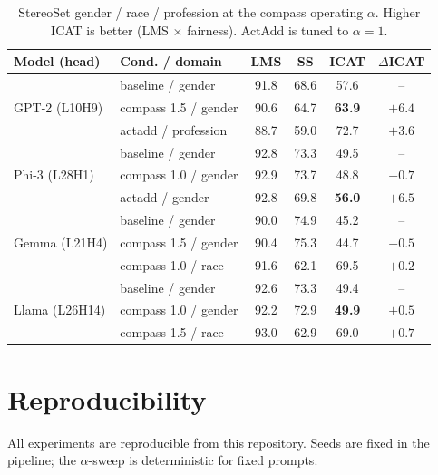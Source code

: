 \begin{table}[h]
\centering
\small
\caption{StereoSet gender / race / profession at the compass
operating $\alpha$. Higher ICAT is better (LMS $\times$ fairness).
ActAdd is tuned to $\alpha=1$.}
\label{tab:stereoset}
\begin{tabular}{llcccc}
\toprule
Model (head) & Cond. / domain & LMS & SS & ICAT & $\Delta$ICAT \\
\midrule
\multirow{3}{*}{GPT-2 (L10H9)}
& baseline / gender      & 91.8 & 68.6 & 57.6 & --     \\
& compass 1.5 / gender   & 90.6 & 64.7 & \textbf{63.9} & $+6.4$ \\
& actadd / profession    & 88.7 & 59.0 & 72.7 & $+3.6$ \\
\midrule
\multirow{3}{*}{Phi-3 (L28H1)}
& baseline / gender      & 92.8 & 73.3 & 49.5 & --     \\
& compass 1.0 / gender   & 92.9 & 73.7 & 48.8 & $-0.7$ \\
& actadd / gender        & 92.8 & 69.8 & \textbf{56.0} & $+6.5$ \\
\midrule
\multirow{3}{*}{Gemma (L21H4)}
& baseline / gender      & 90.0 & 74.9 & 45.2 & --     \\
& compass 1.5 / gender   & 90.4 & 75.3 & 44.7 & $-0.5$ \\
& compass 1.0 / race     & 91.6 & 62.1 & 69.5 & $+0.2$ \\
\midrule
\multirow{3}{*}{Llama (L26H14)}
& baseline / gender      & 92.6 & 73.3 & 49.4 & --     \\
& compass 1.0 / gender   & 92.2 & 72.9 & \textbf{49.9} & $+0.5$ \\
& compass 1.5 / race     & 93.0 & 62.9 & 69.0 & $+0.7$ \\
\bottomrule
\end{tabular}
\end{table}

\section{Reproducibility}
\label{app:repro}

All experiments are reproducible from this repository. Seeds are
fixed in the pipeline; the $\alpha$-sweep is deterministic for
fixed prompts.

